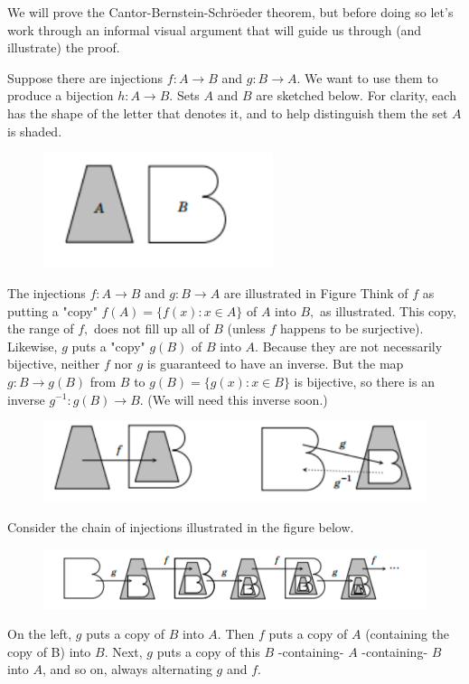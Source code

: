 \documentclass[12pt]{book}
\theoremstyle{definition}\newtheorem{dfn}{Définition}[chapter]
\theoremstyle{plain}\newtheorem{thm}{Théorème}[chapter]
\theoremstyle{plain}\newtheorem{prp}{Proposition}[chapter]
\theoremstyle{plain}\newtheorem{lem}{\bf Lemme}[chapter]
\theoremstyle{plain}\newtheorem{axm}{\bf Axiome}[chapter]
\theoremstyle{plain}\newtheorem{lmm}{\bf Lemme}[chapter]
\theoremstyle{plain}\newtheorem{cor}{\bf Corollaire}[chapter]
\theoremstyle{remark}\newtheorem{rem}{Remarque}[chapter]
\begin{document}
We will prove the Cantor-Bernstein-Schröeder theorem, but before doing so let's work through an informal visual argument that will guide us through (and illustrate) the proof.

Suppose there are injections $f: A \rightarrow B$ and $g: B
\rightarrow A$. We want to use them to produce a bijection $h: A
\rightarrow B .$ Sets $A$ and $B$ are sketched below. For clarity,
each has the shape of the letter that denotes it, and to help
distinguish them the set $A$ is shaded.
\begin{figure}[H]\centering\includegraphics[width=0.6\textwidth]{image//Vocabulaire de theorie des ensembles//1}\end{figure}
The injections $f: A \rightarrow B$ and $g: B \rightarrow A$ are
illustrated in Figure  Think of $f$ as putting a "copy" $f(A)=\{f(x):
x \in A\}$ of $A$ into $B,$ as illustrated. This copy, the range of
$f,$ does not fill up all of $B$ (unless $f$ happens to be
surjective). Likewise, $g$ puts a "copy" $g(B)$ of $B$ into
$A$. Because they are not necessarily bijective, neither $f$ nor $g$
is guaranteed to have an inverse. But the map $g: B \rightarrow g(B)$
from $B$ to $g(B)=\{g(x): x \in B\}$ is bijective, so there is an
inverse $g^{-1}: g(B) \rightarrow B$. (We will need this inverse
soon.)
\begin{figure}[H]\centering\includegraphics[width=1\textwidth]{image//Vocabulaire de theorie des ensembles//2}\end{figure}
Consider the chain of injections illustrated in the figure below.
\begin{figure}[H]\centering\includegraphics[width=1.2\textwidth]{image//Vocabulaire de theorie des ensembles//3}\end{figure}
 On the left, $g$ puts a copy of $B$ into $A$. Then $f$ puts a copy of $A$ (containing the copy of B) into $B$. Next, $g$ puts a copy of this $B$ -containing- $A$ -containing- $B$ into $A$, and so on, always alternating $g$ and $f$.
\end{document}
